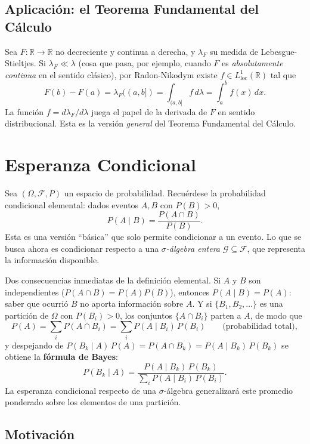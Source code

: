 \documentclass[11pt, a4paper]{article}
\begin{document}
\subsection{Aplicación: el Teorema Fundamental del Cálculo}

Sea $F: \mathbb{R} \to \mathbb{R}$ no decreciente y continua a derecha, y $\lambda_F$ su medida de
Lebesgue-Stieltjes. Si $\lambda_F \ll \lambda$ (cosa que pasa, por ejemplo, cuando $F$ es
\emph{absolutamente continua} en el sentido clásico), por Radon-Nikodym existe
$f \in L^1_{\mathrm{loc}}(\mathbb{R})$ tal que
$$ F(b) - F(a) = \lambda_F((a, b]) = \int_{(a, b]} f \, d\lambda = \int_a^b f(x) \, dx. $$
La función $f = d\lambda_F / d\lambda$ juega el papel de la derivada de $F$ en sentido
distribucional. Esta es la versión \emph{general} del Teorema Fundamental del Cálculo.

\newpage

\section{Esperanza Condicional}

Sea $(\Omega, \mathcal{F}, P)$ un espacio de probabilidad. Recuérdese la probabilidad condicional
elemental: dados eventos $A, B$ con $P(B) > 0$,
$$ P(A \mid B) = \frac{P(A \cap B)}{P(B)}. $$
Esta es una versión ``básica'' que solo permite condicionar a un evento. Lo que se busca ahora
es condicionar respecto a una \emph{$\sigma$-álgebra entera} $\mathcal{G} \subseteq \mathcal{F}$,
que representa la información disponible.

\obs Dos consecuencias inmediatas de la definición elemental. Si $A$ y $B$ son independientes
($P(A \cap B) = P(A) P(B)$), entonces $P(A \mid B) = P(A)$: saber que ocurrió $B$ no aporta
información sobre $A$. Y si $\{B_1, B_2, \dots\}$ es una partición de $\Omega$ con
$P(B_i) > 0$, los conjuntos $\{A \cap B_i\}$ parten a $A$, de modo que
$$ P(A) = \sum_i P(A \cap B_i) = \sum_i P(A \mid B_i) \, P(B_i)
\qquad \text{(probabilidad total)}, $$
y despejando de $P(B_k \mid A) \, P(A) = P(A \cap B_k) = P(A \mid B_k) \, P(B_k)$ se obtiene la
\textbf{fórmula de Bayes}:
$$ P(B_k \mid A) = \frac{P(A \mid B_k) \, P(B_k)}{\sum_i P(A \mid B_i) \, P(B_i)}. $$
La esperanza condicional respecto de una $\sigma$-álgebra generalizará este promedio ponderado
sobre los elementos de una partición.

\subsection{Motivación}
\end{document}
